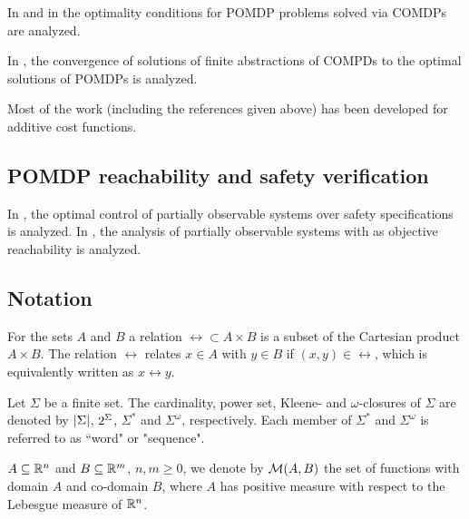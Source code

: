 \documentclass[conference]{IEEEtran}
\begin{document}
In \cite{feinberg2016partially} and in \cite{feinberg2014optimality} the optimality conditions for POMDP problems solved via COMDPs are analyzed. 

In \cite{saldi2017finite}, the convergence of solutions of finite abstractions of COMPDs to the optimal solutions of POMDPs is analyzed. 


Most of the work (including the references given above) has been developed for additive cost functions. 


\subsection{POMDP reachability and safety verification}

In \cite{ding2013optimal}, the optimal control of partially observable systems over safety specifications is analyzed. 
In \cite{LESSER20141989}, the analysis of partially observable systems with as objective reachability is analyzed. 


\subsection{Notation}

For the sets $A$ and $B$ a relation $\rel\subset A\times B$ is a subset of the Cartesian product $A\times B$. The relation $\rel$ relates $x\in A$ with $y\in B$ if $(x,y)\in\rel$, which is equivalently written as $x\rel y$.




    Let $\Sigma$ be a finite set. The cardinality,
    power set, Kleene- and $\omega$-closures
    of $\Sigma$ are denoted by $\left| {\Sigma} \right|$,
    $2^{\Sigma}$, $\Sigma^*$ and $\Sigma^\omega$,
    respectively.    
    Each member of $\Sigma^*$ and $\Sigma^\omega$ is referred to as ``word" or "sequence". 
    
    
    $A \subseteq \mathbb{R}^n$ and $B \subseteq \mathbb{R}^m$,
    $n, m \geq 0$, we denote by $\mathcal{M}(A, B)$ the set of
    functions with domain $A$ and co-domain $B$, where $A$ has positive measure with
    respect to the Lebesgue measure of $\mathbb{R}^n$.
    
\end{document}
